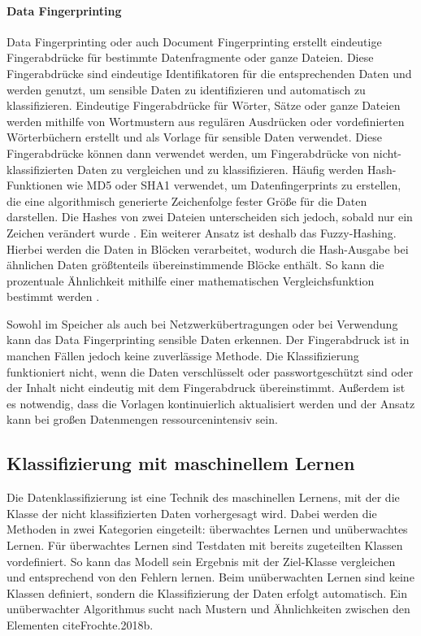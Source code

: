 \paragraph{Data Fingerprinting} \label{fingerprint}
Data Fingerprinting oder auch Document Fingerprinting erstellt eindeutige Fingerabdrücke für bestimmte Datenfragmente oder ganze Dateien. Diese Fingerabdrücke sind eindeutige Identifikatoren für die entsprechenden Daten und werden genutzt, um sensible Daten zu identifizieren und automatisch zu klassifizieren. Eindeutige Fingerabdrücke für Wörter, Sätze oder ganze Dateien werden mithilfe von Wortmustern aus regulären Ausdrücken oder vordefinierten Wörterbüchern erstellt und als Vorlage für sensible Daten verwendet. Diese Fingerabdrücke können dann verwendet werden, um Fingerabdrücke von nicht-klassifizierten Daten zu vergleichen und zu klassifizieren.
Häufig werden Hash-Funktionen wie MD5 oder SHA1 verwendet, um Datenfingerprints zu erstellen, die eine algorithmisch generierte Zeichenfolge fester Größe für die Daten darstellen. Die Hashes von zwei Dateien unterscheiden sich jedoch, sobald nur ein Zeichen verändert wurde \cite{Alneyadi.2016}. Ein weiterer Ansatz ist deshalb das \glqq Fuzzy-Hashing\grqq. Hierbei werden die Daten in Blöcken verarbeitet, wodurch die Hash-Ausgabe bei ähnlichen Daten größtenteils übereinstimmende Blöcke enthält. So kann die prozentuale Ähnlichkeit mithilfe einer mathematischen Vergleichsfunktion bestimmt werden \cite{Shu.2015}.

Sowohl im Speicher als auch bei Netzwerkübertragungen oder bei Verwendung kann das Data Fingerprinting sensible Daten erkennen. Der Fingerabdruck ist in manchen Fällen jedoch keine zuverlässige Methode. Die Klassifizierung funktioniert nicht, wenn die Daten verschlüsselt oder passwortgeschützt sind oder der Inhalt nicht eindeutig mit dem Fingerabdruck übereinstimmt. Außerdem ist es notwendig, dass die Vorlagen kontinuierlich aktualisiert werden und der Ansatz kann bei großen Datenmengen ressourcenintensiv sein.


\subsection{Klassifizierung mit maschinellem Lernen}
Die Datenklassifizierung ist eine Technik des maschinellen Lernens, mit der die Klasse der nicht klassifizierten Daten vorhergesagt wird. Dabei werden die Methoden in zwei Kategorien eingeteilt: überwachtes Lernen und unüberwachtes Lernen. Für überwachtes Lernen sind Testdaten mit bereits zugeteilten Klassen vordefiniert. So kann das Modell sein Ergebnis mit der Ziel-Klasse vergleichen und entsprechend von den Fehlern lernen. Beim unüberwachten Lernen sind keine Klassen definiert, sondern die Klassifizierung der Daten erfolgt automatisch. Ein unüberwachter Algorithmus sucht nach Mustern und Ähnlichkeiten zwischen den Elementen cite{Frochte.2018b}.

